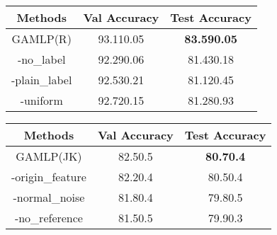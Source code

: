 \documentclass[sigconf]{acmart}
\begin{document}
\begin{table}
     \centering
    \label{tab:ablation_label}
     \begin{tabular}{c|cc}
\toprule
\textbf{Methods} & \textbf{Val Accuracy} & \textbf{Test Accuracy} \\
\midrule
GAMLP(R) & 93.110.05 & \textbf{83.590.05}  \\
-no\_label & 92.290.06 & 81.430.18  \\
-plain\_label & 92.530.21 & 81.120.45  \\
-uniform &92.720.15 & 81.280.93  \\
\bottomrule
\end{tabular}
\end{table}

\begin{table}
     \centering
    \label{tab:ablation_reference}
     \begin{tabular}{c|cc}
\toprule
\textbf{Methods} & \textbf{Val Accuracy} & \textbf{Test Accuracy} \\
\midrule
GAMLP(JK) & 82.50.5 &  \textbf{80.70.4}\\
-origin\_feature & 82.20.4 & 80.50.4  \\
-normal\_noise & 81.80.4 & 79.80.5 \\
-no\_reference & 81.50.5 & 79.90.3  \\
\bottomrule
\end{tabular}
\end{table}

\begin{table}[tpb!]
\caption{Test accuracy on ogbn-mag dataset.}
\centering
{
\noindent
\renewcommand{\multirowsetup}{\centering}
}
\label{table.mag_performance}
\vspace{-4mm}
\end{table}
\end{document}
